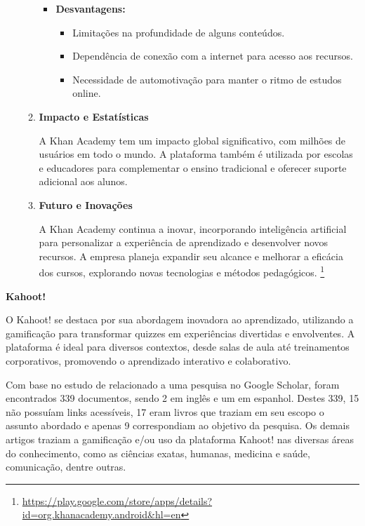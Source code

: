 \begin{itemize}
\begin{enumerate}
\begin{itemize}
            \item \textbf{Desvantagens:}
            \begin{itemize}
                \item Limitações na profundidade de alguns conteúdos.
                \item Dependência de conexão com a internet para acesso aos recursos.
                \item Necessidade de automotivação para manter o ritmo de estudos online.
            \end{itemize}
        \end{itemize}

        \item \textbf{Impacto e Estatísticas}
        
        A Khan Academy tem um impacto global significativo, com milhões de usuários em todo o mundo. A plataforma também é utilizada por escolas e educadores para complementar o ensino tradicional e oferecer suporte adicional aos alunos.

        \item \textbf{Futuro e Inovações}
        
        A Khan Academy continua a inovar, incorporando inteligência artificial para personalizar a experiência de aprendizado e desenvolver novos recursos. A empresa planeja expandir seu alcance e melhorar a eficácia dos cursos, explorando novas tecnologias e métodos pedagógicos.
        \footnote{\url{https://play.google.com/store/apps/details?id=org.khanacademy.android&hl=en}}
    \end{enumerate}
    
\end{itemize}

    \item \textbf{Kahoot!}

    O Kahoot! se destaca por sua abordagem inovadora ao aprendizado, utilizando a gamificação para transformar quizzes em experiências divertidas e envolventes. A plataforma é ideal para diversos contextos, desde salas de aula até treinamentos corporativos, promovendo o aprendizado interativo e colaborativo. 
    
    Com base no estudo de \cite{mesquita2023gamificaccao} relacionado a uma pesquisa no Google Scholar, foram encontrados 339 documentos, sendo 2 em inglês e um em espanhol. Destes 339, 15 não possuíam links acessíveis, 17 eram livros que traziam em seu escopo o assunto abordado e apenas 9 correspondiam ao objetivo da pesquisa. Os demais artigos traziam a gamificação e/ou uso da plataforma Kahoot! nas diversas áreas do conhecimento, como as ciências exatas, humanas, medicina e saúde, comunicação, dentre outras. 

